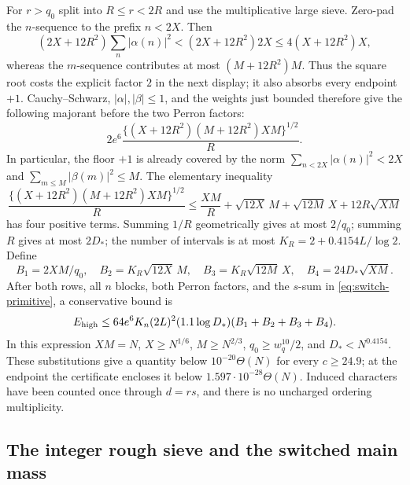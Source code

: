 \documentclass[11pt]{article}
\theoremstyle{definition}
\newcommand{\Th}{\Theta(N)}
\begin{document}
For $r>q_0$ split into $R\le r<2R$ and use the multiplicative large
sieve.  Zero-pad the $n$-sequence to the prefix $n<2X$.  Then
\[
 (2X+12R^2)\sum_n|\alpha(n)|^2
 <(2X+12R^2)2X\le4(X+12R^2)X,
\]
whereas the $m$-sequence contributes at most
$(M+12R^2)M$.  Thus the square root costs the explicit factor $2$
in the next display; it also absorbs every endpoint $+1$.
Cauchy--Schwarz, $|\alpha|,|\beta|\le1$, and the weights just bounded
therefore give the following majorant before the two Perron factors:
\[
 2e^6\frac{\{(X+12R^2)(M+12R^2)XM\}^{1/2}}R.
\]
In particular, the floor $+1$ is already covered by the norm
$\sum_{n<2X}|\alpha(n)|^2<2X$ and
$\sum_{m\le M}|\beta(m)|^2\le M$.
The elementary inequality
\[
 \frac{\{(X+12R^2)(M+12R^2)XM\}^{1/2}}R
 \le\frac{XM}R+\sqrt{12X}\,M+\sqrt{12M}\,X+12R\sqrt{XM}
\]
has four positive terms.  Summing $1/R$ geometrically gives at most
$2/q_0$; summing $R$ gives at most $2D_*$; the number of intervals
is at most $K_R=2+0.4154L/\log2$.  Define
\[
 B_1=2XM/q_0,\quad B_2=K_R\sqrt{12X}\,M,\quad
 B_3=K_R\sqrt{12M}\,X,\quad B_4=24D_*\sqrt{XM}.
\]
After both rows, all $n$ blocks, both Perron factors, and the
$s$-sum in \eqref{eq:switch-primitive}, a conservative bound is
\begin{equation}\label{eq:switch-high}
 E_{\rm high}\le64e^6K_n(2L)^2(1.1\log D_*)
                 (B_1+B_2+B_3+B_4).
\end{equation}
In this expression $XM=N$, $X\ge N^{1/6}$, $M\ge N^{2/3}$,
$q_0\ge w_q^{10}/2$, and $D_*<N^{0.4154}$.
These substitutions give a quantity below $10^{-20}\Th$ for every
$c\ge24.9$; at the endpoint the certificate encloses it below
$1.597\cdot10^{-28}\Th$.  Induced characters have been counted
once through $d=rs$, and there is no uncharged ordering multiplicity.

\subsection{The integer rough sieve and the switched main mass}
\end{document}
